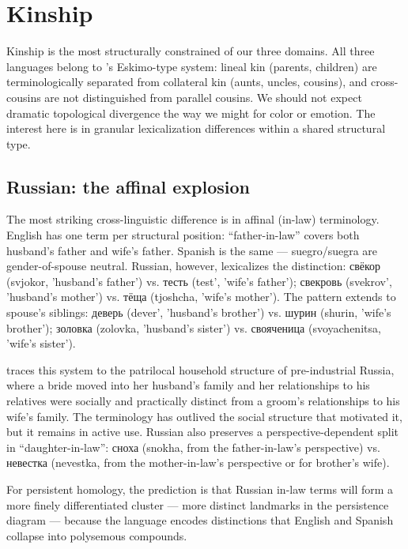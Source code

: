 \section{Kinship}
\label{sec:kinship}

Kinship is the most structurally constrained of our three domains. All three languages belong to \textcite{murdock1949}'s Eskimo-type system: lineal kin (parents, children) are terminologically separated from collateral kin (aunts, uncles, cousins), and cross-cousins are not distinguished from parallel cousins. We should not expect dramatic topological divergence the way we might for color or emotion. The interest here is in granular lexicalization differences within a shared structural type.

\subsection{Russian: the affinal explosion}
\label{sec:russian-kinship}

The most striking cross-linguistic difference is in affinal (in-law) terminology. English has one term per structural position: ``father-in-law'' covers both husband's father and wife's father. Spanish is the same --- suegro/suegra are gender-of-spouse neutral. Russian, however, lexicalizes the distinction: свёкор (svjokor, 'husband's father') vs. тесть (test', 'wife's father'); свекровь (svekrov', 'husband's mother') vs. тёща (tjoshcha, 'wife's mother'). The pattern extends to spouse's siblings: деверь (dever', 'husband's brother') vs. шурин (shurin, 'wife's brother'); золовка (zolovka, 'husband's sister') vs. свояченица (svoyachenitsa, 'wife's sister').

\textcite{friedrich1964} traces this system to the patrilocal household structure of pre-industrial Russia, where a bride moved into her husband's family and her relationships to his relatives were socially and practically distinct from a groom's relationships to his wife's family. The terminology has outlived the social structure that motivated it, but it remains in active use. Russian also preserves a perspective-dependent split in ``daughter-in-law'': сноха (snokha, from the father-in-law's perspective) vs. невестка (nevestka, from the mother-in-law's perspective or for brother's wife).

For persistent homology, the prediction is that Russian in-law terms will form a more finely differentiated cluster --- more distinct landmarks in the persistence diagram --- because the language encodes distinctions that English and Spanish collapse into polysemous compounds.

